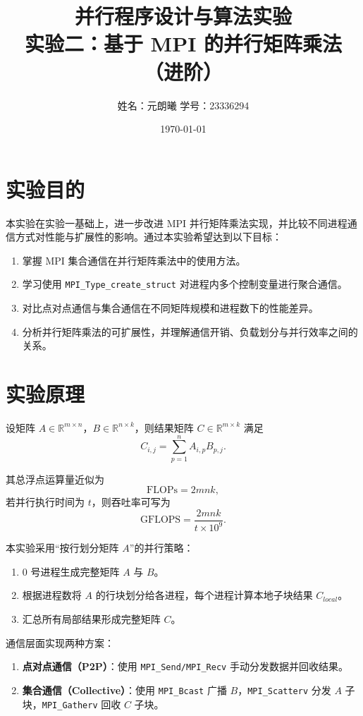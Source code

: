 \documentclass[12pt,a4paper]{ctexart}
\title{并行程序设计与算法实验\\实验二：基于 MPI 的并行矩阵乘法（进阶）}
\author{姓名：元朗曦 \quad 学号：23336294}
\date{\today}
\begin{document}
\maketitle

\section{实验目的}
本实验在实验一基础上，进一步改进 MPI 并行矩阵乘法实现，并比较不同进程通信方式对性能与扩展性的影响。通过本实验希望达到以下目标：
\begin{enumerate}[itemsep=0.3em]
  \item 掌握 MPI 集合通信在并行矩阵乘法中的使用方法。
  \item 学习使用 \texttt{MPI\_Type\_create\_struct} 对进程内多个控制变量进行聚合通信。
  \item 对比点对点通信与集合通信在不同矩阵规模和进程数下的性能差异。
  \item 分析并行矩阵乘法的可扩展性，并理解通信开销、负载划分与并行效率之间的关系。
\end{enumerate}

\section{实验原理}
设矩阵 $A \in \mathbb{R}^{m\times n}$，$B \in \mathbb{R}^{n\times k}$，则结果矩阵 $C \in \mathbb{R}^{m\times k}$ 满足
\begin{equation}
C_{i,j}=\sum_{p=1}^{n}A_{i,p}B_{p,j}.
\end{equation}

其总浮点运算量近似为
\begin{equation}
\mathrm{FLOPs}=2mnk,
\end{equation}
若并行执行时间为 $t$，则吞吐率可写为
\begin{equation}
\mathrm{GFLOPS}=\frac{2mnk}{t\times 10^9}.
\end{equation}

本实验采用“按行划分矩阵 $A$”的并行策略：
\begin{enumerate}[itemsep=0.3em]
  \item 0 号进程生成完整矩阵 $A$ 与 $B$。
  \item 根据进程数将 $A$ 的行块划分给各进程，每个进程计算本地子块结果 $C_{local}$。
  \item 汇总所有局部结果形成完整矩阵 $C$。
\end{enumerate}

通信层面实现两种方案：
\begin{enumerate}[itemsep=0.3em]
  \item \textbf{点对点通信（P2P）}：使用 \texttt{MPI\_Send/MPI\_Recv} 手动分发数据并回收结果。
  \item \textbf{集合通信（Collective）}：使用 \texttt{MPI\_Bcast} 广播 $B$，\texttt{MPI\_Scatterv} 分发 $A$ 子块，\texttt{MPI\_Gatherv} 回收 $C$ 子块。
\end{enumerate}
\end{document}
